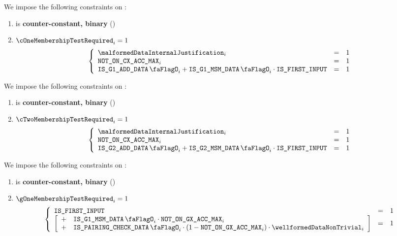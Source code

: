 We impose the following constraints on \cOneMembershipTestRequired{}:
\begin{enumerate}
    \item \cOneMembershipTestRequired{} is \textbf{counter-constant, binary} \quad (\trash)
    \item \If $\cOneMembershipTestRequired_{i} = 1$ \Then
        \[
            \left\{ \begin{array}{lcl}
                \malformedDataInternalJustification _{i} & = & 1 \\
                \notOnCXAccMax_{i}         & = & 1 \\
                \isBlsGOneAddData_{i} + \isBlsGOneMsmData_{i} \cdot \isFirstInput & = & 1 \\
            \end{array} \right.
        \]
\end{enumerate}
\noindent
We impose the following constraints on \cTwoMembershipTestRequired{}:
\begin{enumerate}
    \item \cTwoMembershipTestRequired{} is \textbf{counter-constant, binary} \quad (\trash)
    \item \If $\cTwoMembershipTestRequired_{i} = 1$ \Then
        \[
            \left\{ \begin{array}{lcl}
                \malformedDataInternalJustification _{i} & = & 1 \\
                \notOnCXAccMax_{i}         & = & 1 \\
                \isBlsGTwoAddData_{i} + \isBlsGTwoMsmData_{i} \cdot \isFirstInput & = & 1 \\
            \end{array} \right.
        \]
\end{enumerate}
\noindent
We impose the following constraints on \gOneMembershipTestRequired{}:
\begin{enumerate}
    \item \gOneMembershipTestRequired{} is \textbf{counter-constant, binary} \quad (\trash)
    \item \If $\gOneMembershipTestRequired_{i} = 1$ \Then
        \[
            \left\{ \begin{array}{lcl}
                \isFirstInput & = & 1 \\
                \left[ \begin{array}{cl}
                    + & \isBlsGOneMsmData_{i} \cdot \notOnGXAccMax_{i}  \\
                    + & \isBlsPairingCheckData_{i} \cdot (1 - \notOnGXAccMax_{i}) \cdot \wellformedDataNonTrivial_{i} \\
                \end{array} \right] & = & 1 \\
            \end{array} \right.
        \]
\end{enumerate}
